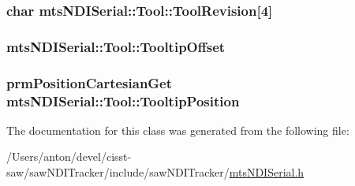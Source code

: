 \subsubsection[{Tool\+Revision}]{\setlength{\rightskip}{0pt plus 5cm}char mts\+N\+D\+I\+Serial\+::\+Tool\+::\+Tool\+Revision\mbox{[}4\mbox{]}}\label{classmts_n_d_i_serial_1_1_tool_aadd9c102dca4f53e5ea50188ddebc9e0}
\hypertarget{classmts_n_d_i_serial_1_1_tool_aa8acfe8b5a76a1fc7816233d6f853049}{}
\subsubsection[{Tooltip\+Offset}]{ mts\+N\+D\+I\+Serial\+::\+Tool\+::\+Tooltip\+Offset}\label{classmts_n_d_i_serial_1_1_tool_aa8acfe8b5a76a1fc7816233d6f853049}
\hypertarget{classmts_n_d_i_serial_1_1_tool_aef4e9c123a79afda4c764d27faeac338}{}
\subsubsection[{Tooltip\+Position}]{\setlength{\rightskip}{0pt plus 5cm}prm\+Position\+Cartesian\+Get mts\+N\+D\+I\+Serial\+::\+Tool\+::\+Tooltip\+Position}\label{classmts_n_d_i_serial_1_1_tool_aef4e9c123a79afda4c764d27faeac338}


The documentation for this class was generated from the following file\+:\begin{DoxyCompactItemize}
\item 
/\+Users/anton/devel/cisst-\/saw/saw\+N\+D\+I\+Tracker/include/saw\+N\+D\+I\+Tracker/\hyperlink{mts_n_d_i_serial_8h}{mts\+N\+D\+I\+Serial.\+h}\end{DoxyCompactItemize}
